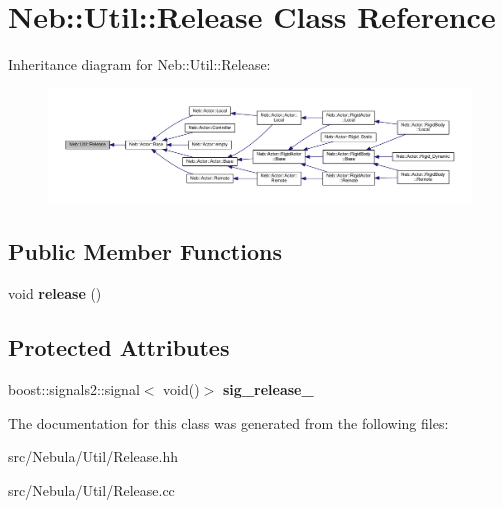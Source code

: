 \hypertarget{classNeb_1_1Util_1_1Release}{\section{Neb\-:\-:Util\-:\-:Release Class Reference}
\label{classNeb_1_1Util_1_1Release}
}


Inheritance diagram for Neb\-:\-:Util\-:\-:Release\-:
\nopagebreak
\begin{figure}[H]
\begin{center}
\leavevmode
\includegraphics[width=350pt]{classNeb_1_1Util_1_1Release__inherit__graph}
\end{center}
\end{figure}
\subsection*{Public Member Functions}
\begin{DoxyCompactItemize}
\item 
\hypertarget{classNeb_1_1Util_1_1Release_a42b6f764403cec132885a62592cac030}{void {\bfseries release} ()}\label{classNeb_1_1Util_1_1Release_a42b6f764403cec132885a62592cac030}

\end{DoxyCompactItemize}
\subsection*{Protected Attributes}
\begin{DoxyCompactItemize}
\item 
\hypertarget{classNeb_1_1Util_1_1Release_a866d7815fa91929b3fdf820bedd400d7}{boost\-::signals2\-::signal$<$ void()$>$ {\bfseries sig\-\_\-release\-\_\-}}\label{classNeb_1_1Util_1_1Release_a866d7815fa91929b3fdf820bedd400d7}

\end{DoxyCompactItemize}


The documentation for this class was generated from the following files\-:\begin{DoxyCompactItemize}
\item 
src/\-Nebula/\-Util/Release.\-hh\item 
src/\-Nebula/\-Util/Release.\-cc\end{DoxyCompactItemize}
